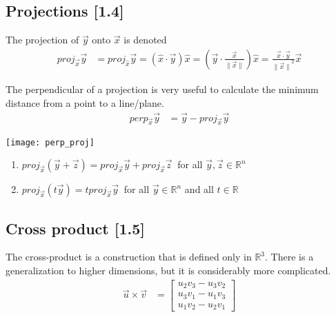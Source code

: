 \documentclass[a4paper,9pt]{extarticle}
\begin{document}
\begin{multicols*}{2}

\subsection{Projections [1.4]}
The projection of $\vec{y}$ onto $\vec{x}$ is denoted
\begin{equation} \label{1.4-1}
    \begin{split}
        proj_{\vec{x}} \vec{y} & = proj_{\hat{x}} \vec{y} = (\hat{x} \cdot \vec{y}) \hat{x}
        = (\vec{y} \cdot \frac{\vec{x}}{\|\vec{x}\|}) \hat{x} = \frac{\vec{x} \cdot \vec{y}}{{\|\vec{x}\|}^2} \vec{x}
    \end{split}
\end{equation}

The perpendicular of a projection is very useful to calculate the minimum distance from a point to a line/plane.
\begin{equation} \label{1.4-2}
    \begin{split}
        perp_{\vec{x}} \vec{y} & = \vec{y} - proj_{\vec{x}} \vec{y}
    \end{split}
\end{equation}
{\centering \texttt{[image: perp\_proj]} \par}

\begin{enumerate}[label=\bfseries (\arabic*)] \itemsep0pt \parskip0pt 
    \item $proj_{\vec{x}} (\vec{y} + \vec{z}) = proj_{\vec{x}} \vec{y} + proj_{\vec{x}} \vec{z} \>$ for all $\vec{y}, \vec{z} \in \mathbb{R}^n$
    \item $proj_{\vec{x}} (t \vec{y}) = t proj_{\vec{x}} \vec{y} \>$ for all $\vec{y} \in \mathbb{R}^n$ and all $t \in \mathbb{R}$
\end{enumerate}


\subsection{Cross product [1.5]}
The cross-product is a construction that is defined only in $\mathbb{R}^3$. There is a generalization to higher dimensions, but it is considerably more complicated.
\begin{equation} \label{1.5-1}
    \begin{split}
        \vec{u} \times \vec{v} & = \begin{bmatrix}u_2 v_3 - u_3 v_2 \\ u_3 v_1 - u_1 v_3 \\ u_1 v_2 - u_2 v_1 \end{bmatrix}
    \end{split}
\end{equation}


\end{multicols*}
\end{document}
